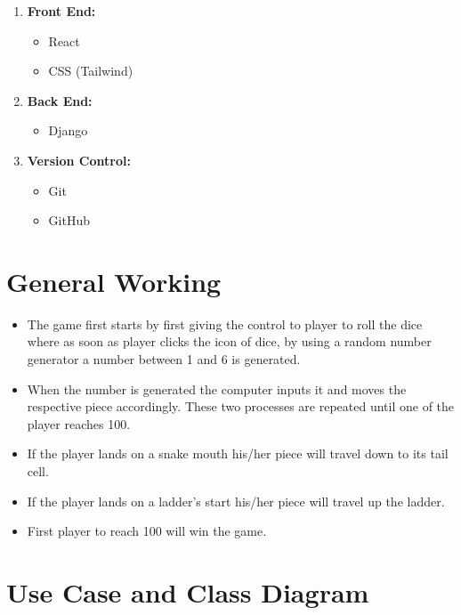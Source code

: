 \documentclass{article}
\begin{document}
    \begin{enumerate}
        \item \textbf{Front End: }
            \begin{itemize}
                \item React
                \item CSS (Tailwind)
            \end{itemize}

        \item \textbf{Back End: }
            \begin{itemize}
                \item Django
            \end{itemize}

        \item \textbf{Version Control: }
        \begin{itemize}
            \item Git
            \item GitHub
        \end{itemize}
    \end{enumerate}
\section{General Working}
    \begin{itemize}
        \item The game first starts by first giving the control to player to roll the dice where as soon as player clicks the icon of dice, by using a random number generator a number between 1 and 6 is generated.
        \item When the number is generated the computer inputs it and moves the respective piece accordingly. These two processes are repeated until one of the player reaches 100.
        \item If the player lands on a snake mouth his/her piece will travel down to its tail cell.
        \item If the player lands on a ladder's start his/her piece will travel up the ladder.
        \item First player to reach 100 will win the game.
    \end{itemize}
\section{Use Case and Class Diagram}
\end{document}
